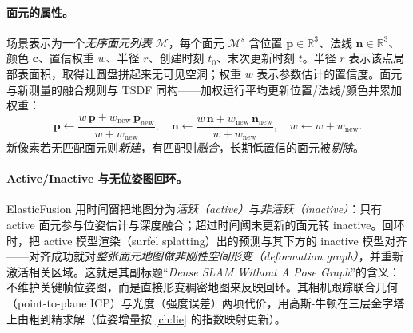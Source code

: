\paragraph{面元的属性。}
场景表示为一个\emph{无序面元列表} $\mathcal{M}$，每个面元 $\mathcal{M}^s$ 含位置 $\mathbf{p}\in\mathbb{R}^3$、法线 $\mathbf{n}\in\mathbb{R}^3$、颜色 $\mathbf{c}$、置信权重 $w$、半径 $r$、创建时刻 $t_0$、末次更新时刻 $t$\cite{whelan2015elasticfusion}。半径 $r$ 表示该点局部表面积，取得让圆盘拼起来无可见空洞；权重 $w$ 表示参数估计的置信度。面元与新测量的融合规则与 TSDF 同构——加权运行平均更新位置/法线/颜色并累加权重\cite{keller2013pointfusion}：
\begin{equation}
  \mathbf{p}\leftarrow\frac{w\,\mathbf{p}+w_{\mathrm{new}}\,\mathbf{p}_{\mathrm{new}}}{w+w_{\mathrm{new}}},\quad
  \mathbf{n}\leftarrow\frac{w\,\mathbf{n}+w_{\mathrm{new}}\,\mathbf{n}_{\mathrm{new}}}{w+w_{\mathrm{new}}},\quad
  w\leftarrow w+w_{\mathrm{new}}.
  \label{eq:dense-surfel-fuse}
\end{equation}
新像素若无匹配面元则\emph{新建}，有匹配则\emph{融合}，长期低置信的面元被\emph{剔除}。

\begin{note}
\end{note}

\paragraph{Active/Inactive 与无位姿图回环。}
ElasticFusion 用时间窗把地图分为\emph{活跃（active）}与\emph{非活跃（inactive）}：只有 active 面元参与位姿估计与深度融合；超过时间阈未更新的面元转 inactive。回环时，把 active 模型渲染（surfel splatting）出的预测与其下方的 inactive 模型对齐——对齐成功就对\emph{整张面元地图做非刚性空间形变（deformation graph）}，并重新激活相关区域。这就是其副标题“\emph{Dense SLAM Without A Pose Graph}”的含义：不维护关键帧位姿图，而是直接形变稠密地图来反映回环。其相机跟踪联合几何（point-to-plane ICP）与光度（强度误差）两项代价，用高斯-牛顿在三层金字塔上由粗到精求解（位姿增量按 \cref{ch:lie} 的指数映射更新）。

